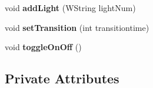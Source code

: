 \begin{DoxyCompactItemize}
\item 
void {\bfseries add\+Light} (W\+String light\+Num)\hypertarget{classGroup_ad864c0549ad004c4947aedc65f459c42}{}\label{classGroup_ad864c0549ad004c4947aedc65f459c42}

\item 
void {\bfseries set\+Transition} (int transitiontime)\hypertarget{classGroup_ad584acb8e1e396868870a60740d32bbb}{}\label{classGroup_ad584acb8e1e396868870a60740d32bbb}

\item 
void {\bfseries toggle\+On\+Off} ()\hypertarget{classGroup_a83ce7e4555d5ab4c908a45dbcde4768d}{}\label{classGroup_a83ce7e4555d5ab4c908a45dbcde4768d}

\end{DoxyCompactItemize}
\subsection*{Private Attributes}
